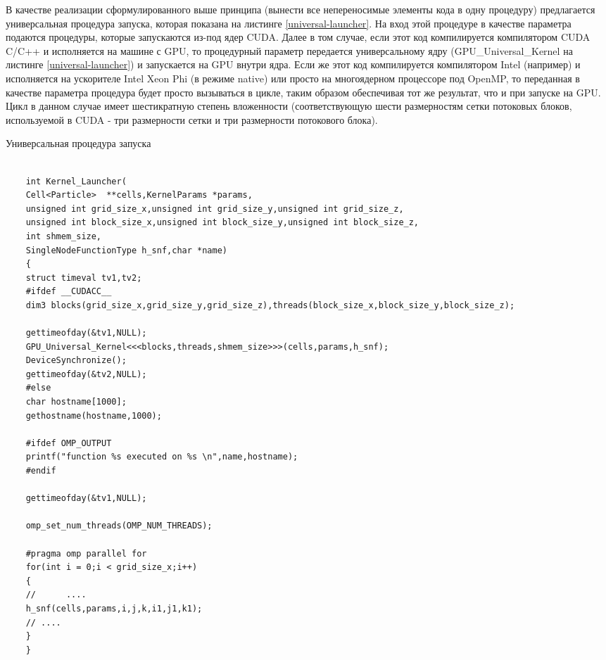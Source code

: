 В качестве реализации сформулированного выше принципа (вынести все непереносимые элементы кода в одну процедуру) предлагается универсальная процедура запуска, которая показана на листинге \ref{universal-launcher}. На вход этой процедуре в качестве параметра подаются процедуры, которые запускаются из-под ядер CUDA. Далее в том случае, если этот код компилируется компилятором CUDA C/C++ и исполняется на машине с GPU, то процедурный параметр передается универсальному ядру (GPU\_Universal\_Kernel на листинге \ref{universal-launcher}) и запускается на GPU внутри ядра. Если же этот код компилируется компилятором Intel (например) и исполняется
на ускорителе Intel Xeon Phi (в режиме native) или просто на многоядерном процессоре под OpenMP, то переданная в качестве параметра процедура будет просто вызываться в цикле, таким образом обеспечивая тот же результат, что и при запуске на GPU. Цикл в данном случае имеет шестикратную степень вложенности (соответствующую шести размерностям сетки потоковых блоков, используемой в CUDA - три размерности сетки и три размерности потокового блока).
\begin{ListingEnv}[!h]
	\captiondelim{ } %
	\caption{Универсальная процедура запуска}
	\label{universal-launcher}	
	\begin{lstlisting}[language={[ISO]C++}]
	
	int Kernel_Launcher(
	Cell<Particle>  **cells,KernelParams *params,
	unsigned int grid_size_x,unsigned int grid_size_y,unsigned int grid_size_z,
	unsigned int block_size_x,unsigned int block_size_y,unsigned int block_size_z,
	int shmem_size,
	SingleNodeFunctionType h_snf,char *name)
	{
	struct timeval tv1,tv2;
	#ifdef __CUDACC__
	dim3 blocks(grid_size_x,grid_size_y,grid_size_z),threads(block_size_x,block_size_y,block_size_z);
	
	gettimeofday(&tv1,NULL);
	GPU_Universal_Kernel<<<blocks,threads,shmem_size>>>(cells,params,h_snf);
	DeviceSynchronize();
	gettimeofday(&tv2,NULL);
	#else
	char hostname[1000];
	gethostname(hostname,1000);
	
	#ifdef OMP_OUTPUT
	printf("function %s executed on %s \n",name,hostname);
	#endif
	
	gettimeofday(&tv1,NULL);
	
	omp_set_num_threads(OMP_NUM_THREADS);
	
	#pragma omp parallel for
	for(int i = 0;i < grid_size_x;i++)
	{
	//      ....              
	h_snf(cells,params,i,j,k,i1,j1,k1);
	// ....
	}
	}
	\end{lstlisting}
\end{ListingEnv}


